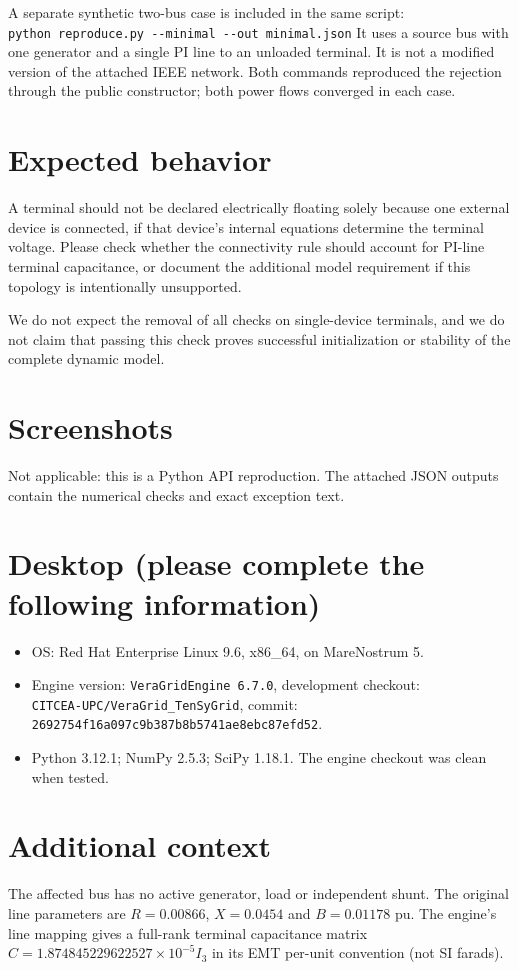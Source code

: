 \documentclass[11pt,a4paper]{article}
\begin{document}
A separate synthetic two-bus case is included in the same script:\\
\verb|python reproduce.py --minimal --out minimal.json|\newline
It uses a source bus with one generator and a single PI line to an unloaded
terminal. It is not a modified version of the attached IEEE network.
Both commands reproduced the rejection through the public constructor;
both power flows converged in each case.

\section*{Expected behavior}
A terminal should not be declared electrically floating solely because one
external device is connected, if that device's internal equations determine
the terminal voltage. Please check whether the connectivity rule should account
for PI-line terminal capacitance, or document the additional model requirement
if this topology is intentionally unsupported.

We do not expect the removal of all checks on single-device terminals, and
we do not claim that passing this check proves successful initialization or
stability of the complete dynamic model.

\section*{Screenshots}
Not applicable: this is a Python API reproduction. The attached JSON outputs
contain the numerical checks and exact exception text.

\section*{Desktop (please complete the following information)}
\begin{itemize}
\item OS: Red Hat Enterprise Linux 9.6, x86\_64, on MareNostrum 5.
\item Engine version: \texttt{VeraGridEngine 6.7.0}, development checkout:\\
\texttt{CITCEA-UPC/VeraGrid\_TenSyGrid}, commit:\\
\texttt{2692754f16a097c9b387b8b5741ae8ebc87efd52}.
\item Python 3.12.1; NumPy 2.5.3; SciPy 1.18.1.
The engine checkout was clean when tested.
\end{itemize}

\section*{Additional context}
The affected bus has no active generator, load or independent shunt. The
original line parameters are $R=0.00866$, $X=0.0454$ and $B=0.01178$ pu.
The engine's line mapping gives a full-rank terminal capacitance matrix
$C=1.874845229622527\times10^{-5}I_3$ in its EMT per-unit convention
(not SI farads).
\end{document}
